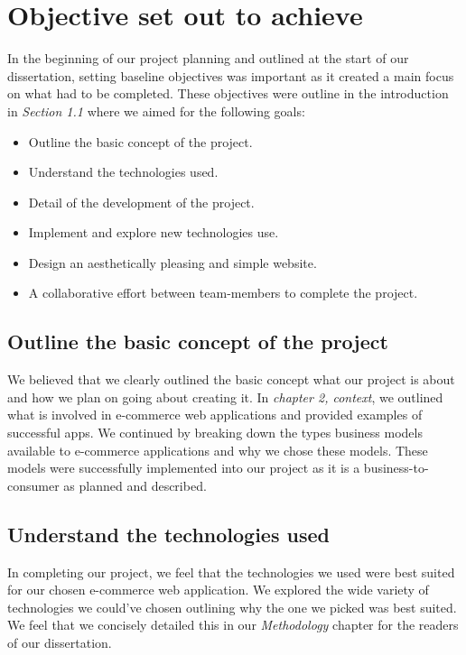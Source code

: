 \section{Objective set out to achieve}
In the beginning of our project planning and outlined at the start of our dissertation, setting baseline objectives was important as it created a main focus on what had to be completed. These objectives were outline in the introduction in \textit{Section 1.1} where we aimed for the following goals:

\begin{itemize}
\item Outline the basic concept of the project.
\item Understand the technologies used.
\item Detail of the development of the project.
\item Implement and explore new technologies use.
\item Design an aesthetically pleasing and simple website.
\item A collaborative effort between team-members to complete the project.
\end{itemize}

\subsection{Outline the basic concept of the project}
We believed that we clearly outlined the basic concept what our project is about and how we plan on going about creating it. In \textit{chapter 2, context}, we outlined what is involved in e-commerce web applications and provided examples of successful apps. We continued by breaking down the types business models available to e-commerce applications and why we chose these models. These models were successfully implemented into our project as it is a business-to-consumer as planned and described.

\subsection{Understand the technologies used}
In completing our project, we feel that the technologies we used were best suited for our chosen e-commerce web application. We explored the wide variety of technologies we could've chosen outlining why the one we picked was best suited. We feel that we concisely detailed this in our \textit{Methodology} chapter for the readers of our dissertation.


